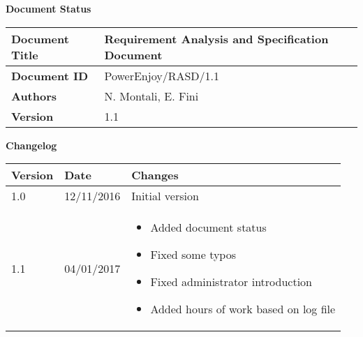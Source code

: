 \textbf{\Huge Document Status}
\begin{center}
    \begin{tabular}{ | l | p{10cm} |}
    \hline
    \textbf{Document Title} & Requirement Analysis and Specification Document \\ \hline
    \textbf{Document ID} & PowerEnjoy/RASD/1.1 \\ \hline
    \textbf{Authors} & N. Montali, E. Fini \\ \hline
    \textbf{Version} & 1.1 \\ \hline
    \end{tabular}
\textbf{\Large Changelog}
     \begin{tabular}{ | l | l | p{10cm} |}
    \hline
    \textbf{Version} & \textbf{Date} & \textbf{Changes} \\ \hline
    1.0 & 12/11/2016 & Initial version \\ \hline
    1.1 & 04/01/2017 & \begin{itemize}
    	\item Added document status 
	\item Fixed some typos
	\item Fixed administrator introduction
	\item Added hours of work based on log file
    \end{itemize}
    \\ \hline
    \end{tabular}
\end{center}